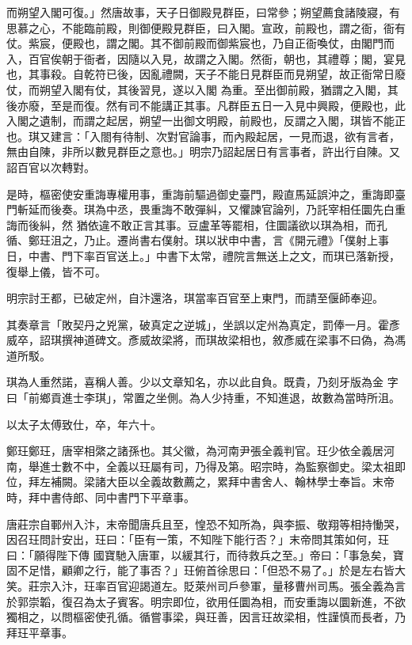 \begin{pinyinscope}
 而朔望入閣可復。」然唐故事，天子日御殿見群臣，曰常參；朔望薦食諸陵寢，有思慕之心，不能臨前殿，則御便殿見群臣，曰入閣。宣政，前殿也，謂之衙，衙有仗。紫宸，便殿也，謂之閣。其不御前殿而御紫宸也，乃自正衙喚仗，由閣門而入，百官俟朝于衙者，因隨以入見，故謂之入閣。然衙，朝也，其禮尊；閣，宴見也，其事殺。自乾符已後，因亂禮闕，天子不能日見群臣而見朔望，故正衙常日廢仗，而朔望入閣有仗，其後習見，遂以入閣
 為重。至出御前殿，猶謂之入閣，其後亦廢，至是而復。然有司不能講正其事。凡群臣五日一入見中興殿，便殿也，此入閣之遺制，而謂之起居，朔望一出御文明殿，前殿也，反謂之入閣，琪皆不能正也。琪又建言：「入閤有待制、次對官論事，而內殿起居，一見而退，欲有言者，無由自陳，非所以數見群臣之意也。」明宗乃詔起居日有言事者，許出行自陳。又詔百官以次轉對。



 是時，樞密使安重誨專權用事，重誨前驅過御史臺門，殿直馬延誤沖之，重誨即臺門斬延而後奏。琪為中丞，畏重誨不敢彈糾，又懼諫官論列，乃託宰相任圜先白重誨而後糾，然
 猶依違不敢正言其事。豆盧革等罷相，住圜議欲以琪為相，而孔循、鄭玨沮之，乃止。遷尚書右僕射。琪以狀申中書，言《開元禮》「僕射上事日，中書、門下率百官送上。」中書下太常，禮院言無送上之文，而琪已落新授，復舉上儀，皆不可。



 明宗討王都，已破定州，自汴還洛，琪當率百官至上東門，而請至偃師奉迎。



 其奏章言「敗契丹之兇黨，破真定之逆城」，坐誤以定州為真定，罰俸一月。霍彥威卒，詔琪撰神道碑文。彥威故梁將，而琪故梁相也，敘彥威在梁事不曰偽，為馮道所駁。



 琪為人重然諾，喜稱人善。少以文章知名，亦以此自負。既貴，乃刻牙版為金
 字曰「前鄉貢進士李琪」，常置之坐側。為人少持重，不知進退，故數為當時所沮。



 以太子太傅致仕，卒，年六十。



 鄭玨鄭玨，唐宰相綮之諸孫也。其父徽，為河南尹張全義判官。玨少依全義居河南，舉進士數不中，全義以玨屬有司，乃得及第。昭宗時，為監察御史。梁太祖即位，拜左補闕。梁諸大臣以全義故數薦之，累拜中書舍人、翰林學士奉旨。末帝時，拜中書侍郎、同中書門下平章事。



 唐莊宗自鄆州入汴，末帝聞唐兵且至，惶恐不知所為，與李振、敬翔等相持慟哭，因召玨問計安出，玨曰：「臣有一策，不知陛下能行否？」末帝問其策如何，玨曰：「願得陛下傳
 國寶馳入唐軍，以緩其行，而待救兵之至。」帝曰：「事急矣，寶固不足惜，顧卿之行，能了事否？」玨俯首徐思曰：「但恐不易了。」於是左右皆大笑。莊宗入汴，玨率百官迎謁道左。貶萊州司戶參軍，量移曹州司馬。張全義為言於郭崇韜，復召為太子賓客。明宗即位，欲用任圜為相，而安重誨以圜新進，不欲獨相之，以問樞密使孔循。循嘗事梁，與玨善，因言玨故梁相，性謹慎而長者，乃拜玨平章事。




\end{pinyinscope}
